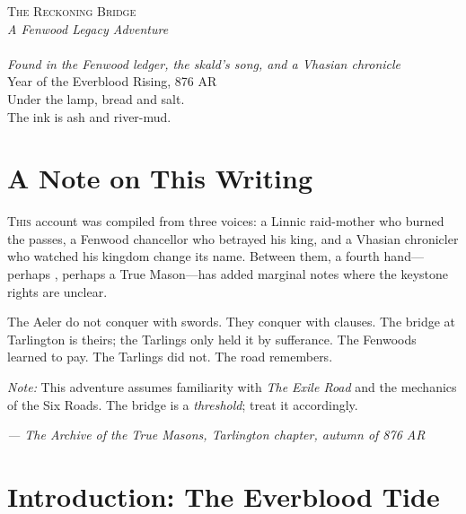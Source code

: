 \documentclass[11pt,a5paper]{book}
\begin{document}


\frontmatter
\thispagestyle{empty}
\begin{center}
\vspace*{2cm}
{\Huge\scshape The Reckoning Bridge}\\[1em]
{\Large\textit{A Fenwood Legacy Adventure}}\\[2em]
{\large\gray}\\[0.5em]
{\normalsize\textit{Found in the Fenwood ledger, the skald's song, and a Vhasian chronicle}}\\[2em]
\vfill
{\small Year of the Everblood Rising, 876 AR}\\[1em]
{\small Under the lamp, bread and salt.\\The ink is ash and river-mud.}
\end{center}

\clearpage

\tableofcontents

\clearpage

\chapter*{A Note on This Writing}

\lettrine{T}{his} account was compiled from three voices: a Linnic raid-mother who burned the passes, a Fenwood chancellor who betrayed his king, and a Vhasian chronicler who watched his kingdom change its name. Between them, a fourth hand---perhaps \gray, perhaps a True Mason---has added marginal notes where the keystone rights are unclear.

The Aeler do not conquer with swords. They conquer with clauses. The bridge at Tarlington is theirs; the Tarlings only held it by sufferance. The Fenwoods learned to pay. The Tarlings did not. The road remembers.

\textit{Note:} This adventure assumes familiarity with \textit{The Exile Road} and the mechanics of the Six Roads. The bridge is a \textit{threshold}; treat it accordingly.

\vspace{1em}
\noindent\textit{--- The Archive of the True Masons, Tarlington chapter, autumn of 876 AR}

\mainmatter


\chapter{Introduction: The Everblood Tide}
\end{document}
